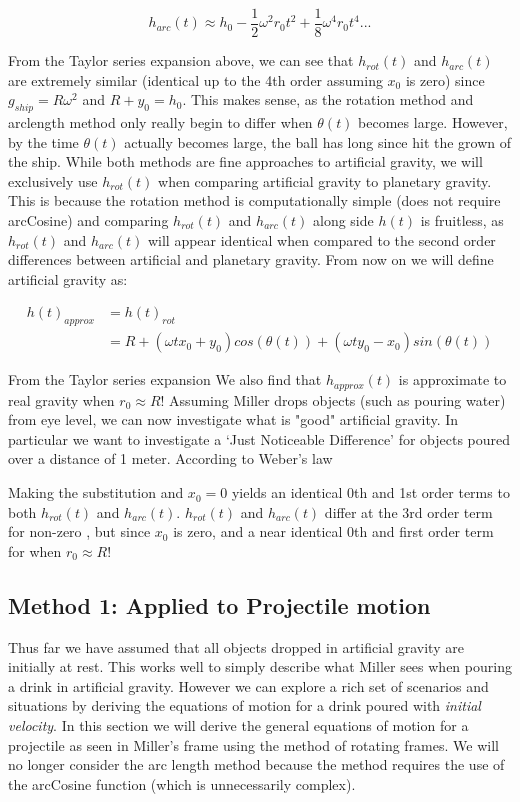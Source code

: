 \documentclass{amsart}
\theoremstyle{definition}
\begin{document}
\begin{equation}
 h_{arc}(t) \approx h_0 -\frac{1}{2}\omega^2 r_0 t^2 + \frac{1}{8}\omega^4 r_0 t^4 ...
\end{equation}

From the Taylor series expansion above, we can see that $h_{rot}(t)$ and $h_{arc}(t)$ are extremely similar (identical up to the 4th order assuming $x_0$ is zero) since $g_{ship} = R \omega^2$ and $R+y_0 = h_0$. This makes sense, as the rotation method and arclength method only really begin to differ when $\theta(t)$ becomes large. However, by the time $\theta(t)$ actually becomes large, the ball has long since hit the grown of the ship. While both methods are fine approaches to artificial gravity, we will exclusively use $h_{rot}(t)$ when comparing artificial gravity to planetary gravity. This is because the rotation method is computationally simple (does not require arcCosine) and comparing $h_{rot}(t)$ and $h_{arc}(t)$ along side $h(t)$ is fruitless, as $h_{rot}(t)$ and $h_{arc}(t)$ will appear identical when compared to the second order differences between artificial and planetary gravity. From now on we will define artificial gravity as:

\begin{equation}\label{eq:approxGravHeight}
\begin{split}
    h(t)_{approx} &= h(t)_{rot} \\
    &=R+(\omega t x_0 + y_0)cos(\theta(t))+(\omega t y_0 - x_0)sin(\theta (t))
\end{split}
\end{equation}

From the Taylor series expansion We also find that $h_{approx}(t)$ is approximate to real gravity when $r_0 \approx R$! Assuming Miller drops objects (such as pouring water) from eye level, we can now investigate what is "good" artificial gravity. In particular we want to investigate a `Just Noticeable Difference' for objects poured over a distance of 1 meter. According to Weber's law

Making the substitution  and $x_0 =0$ yields an identical 0th and 1st order terms to both $h_{rot}(t)$ and $h_{arc}(t)$. $h_{rot}(t)$ and $h_{arc}(t)$ differ at the 3rd order term for non-zero , but since $x_0$ is zero,  and a near identical 0th and first order term for  when $r_0 \approx R$! 


\subsection*{Method 1: Applied to Projectile motion}
Thus far we have assumed that all objects dropped in artificial gravity are initially at rest. This works well to simply describe what Miller sees when pouring a drink in artificial gravity. However we can explore a rich set of scenarios and situations by deriving the equations of motion for a drink poured with \textit{initial velocity}. In this section we will derive the general equations of motion for a projectile as seen in Miller's frame using the method of rotating frames. We will no longer consider the arc length method because the method requires the use of the arcCosine function (which is unnecessarily complex).
\end{document}
